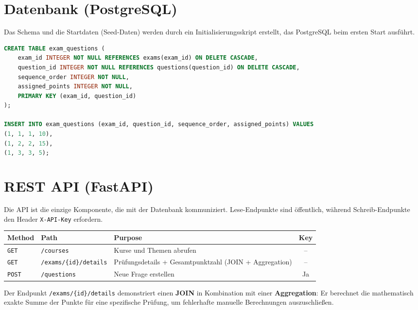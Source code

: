 \documentclass[11pt,a4paper]{article}
\begin{document}
\section{Datenbank (PostgreSQL)}

Das Schema und die Startdaten (Seed-Daten) werden durch ein Initialisierungsskript erstellt, das PostgreSQL beim ersten Start ausführt.

\begin{lstlisting}[language=SQL, caption={init.sql (Auszug) -- N:M Beziehung und Daten}]
CREATE TABLE exam_questions (
    exam_id INTEGER NOT NULL REFERENCES exams(exam_id) ON DELETE CASCADE,
    question_id INTEGER NOT NULL REFERENCES questions(question_id) ON DELETE CASCADE,
    sequence_order INTEGER NOT NULL,
    assigned_points INTEGER NOT NULL,
    PRIMARY KEY (exam_id, question_id)
);

INSERT INTO exam_questions (exam_id, question_id, sequence_order, assigned_points) VALUES 
(1, 1, 1, 10),
(1, 2, 2, 15),
(1, 3, 3, 5);
\end{lstlisting}

\section{REST API (FastAPI)}

Die API ist die einzige Komponente, die mit der Datenbank kommuniziert. Lese-Endpunkte sind öffentlich, während Schreib-Endpunkte den Header \texttt{X-API-Key} erfordern.

\renewcommand{\arraystretch}{1.2}
\begin{tabularx}{\linewidth}{@{}p{1.6cm}p{4.8cm}Xc@{}}
\toprule
\textbf{Method} & \textbf{Path} & \textbf{Purpose} & \textbf{Key} \\
\midrule
\texttt{GET}  & \texttt{/courses} & Kurse und Themen abrufen & -- \\
\texttt{GET}  & \texttt{/exams/\{id\}/details} & Prüfungsdetails + Gesamtpunktzahl (JOIN + Aggregation) & -- \\
\texttt{POST} & \texttt{/questions} & Neue Frage erstellen & Ja \\
\bottomrule
\end{tabularx}

\medskip
Der Endpunkt \texttt{/exams/\{id\}/details} demonstriert einen \textbf{JOIN} in Kombination mit einer \textbf{Aggregation}: Er berechnet die mathematisch exakte Summe der Punkte für eine spezifische Prüfung, um fehlerhafte manuelle Berechnungen auszuschließen.
\end{document}
